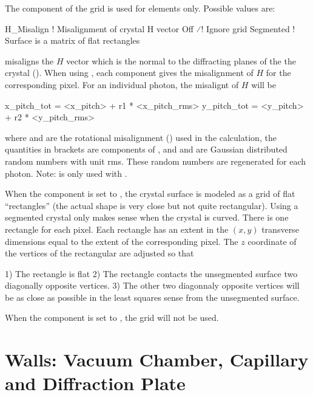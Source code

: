 The  component of the grid is used for
 elements only. Possible  values are:
\begin{example}
  H_Misalign         ! Misalignment of crystal H vector
  Off               ⁄! Ignore grid
  Segmented          ! Surface is a matrix of flat rectangles
\end{example}
 misaligns the $H$ vector which is the normal to the
diffracting planes of the the crystal ().
When using , each  component gives the
misalignment of $H$ for the corresponding pixel. For an individual
photon, the misalignt of $H$ will be
\begin{example}
  x_pitch_tot = <x_pitch> + r1 * <x_pitch_rms>
  y_pitch_tot = <y_pitch> + r2 * <y_pitch_rms>
\end{example}
where  and  are the rotational
misalignment () used in the calculation, the quantities
in brackets  are components of , and  and
 are Gaussian distributed random numbers with unit rms. These
random numbers are regenerated for each photon. Note:  is only
used with .

When the  component is set to , the crystal
surface is modeled as a grid of flat ``rectangles'' (the actual shape
is very close but not quite rectangular). Using a segmented crystal
only makes sense when the crystal is curved. There is one rectangle
for each pixel. Each rectangle has an extent in the $(x,y)$ transverse
dimensions equal to the extent of the corresponding pixel. The $z$
coordinate of the vertices of the rectangular are adjusted so that 
\begin{example}
  1) The rectangle is flat
  2) The rectangle contacts the unsegmented surface two diagonally opposite vertices.
  3) The other two diagonnaly opposite vertices will be as close as possible in the
     least squares sense from the unsegmented surface.
\end{example}

When the  component is set to , the grid will not be used.

\section{Walls: Vacuum Chamber, Capillary and Diffraction Plate}
\label{s:wall}

